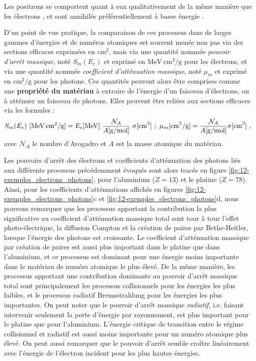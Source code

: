 \begin{refsection}
Les positrons se comportent quant à eux qualitativement de la même manière que les électrons \parencite{rohrlich_1954}, et sont annihilés préférentiellement à basse énergie \parencite{carron_2007}.


D'un point de vue pratique, la comparaison de ces processus dans de larges gammes d'énergies et de numéros atomiques est souvent menée non pas via des sections efficaces exprimées en $\si{\cm^2}$, mais via une quantité nommée \textit{pouvoir d'arrêt massique}, noté $S_m(E_e)$ et exprimé en $\si{\MeV ~ \cm^2\per\g}$ pour les électrons, et via une quantité nommée \textit{coefficient d'atténuation massique}, noté $\mu_m$ et exprimé en $\si{\cm^2\per\g}$ pour les photons. Ces quantités peuvent alors être comprises comme une \textbf{propriété du matériau} à extraire de l'énergie d'un faisceau d'électrons, ou à atténuer un faisceau de photons. Elles peuvent être reliées aux sections efficaces via les formules \parencite{carron_2007} :
\begin{equation}
    S_m(E_e) ~ \si{[MeV ~ cm^2/g]} = E_e \si{[MeV]} ~\dfrac{\mathcal{N}_A}{A \si{[g/mol]}} ~ \sigma \si{[cm^2]}~ ; ~
    \mu_m \si{[cm^2/g]} = \dfrac{\mathcal{N}_A}{A \si{[g/mol]}} \sigma \si{[cm^2]} ~ \rm ,
\end{equation}
avec $\mathcal{N}_A$ le nombre d'Avogadro et $A$ est la masse atomique du matériau.

Les pouvoirs d'arrêt des électrons et coefficients d'atténuation des photons liés aux différents processus précédemment évoqués sont alors tracés en figure \ref{fig:12-exemples_electrons_photons}, pour l'aluminium ($Z=13$) et le platine ($Z=78$). Ainsi, pour les coefficients d'atténuations affichés en figures \ref{fig:12-exemples_electrons_photons}c et \ref{fig:12-exemples_electrons_photons}d, nous pouvons remarquer que les processus apportant la contribution la plus significative au coefficient d'atténuation massique total sont tour à tour l'effet photo-électrique, la diffusion Compton et la création de paires par Bethe-Heitler, lorsque l'énergie des photons est croissante. Le coefficient d'atténuation massique par création de paires est aussi plus important dans le platine que dans l'aluminium, et ce processus est dominant pour une énergie moins importante dans le matériau de numéro atomique le plus élevé. De la même manière, les processus apportant une contribution dominante au pouvoir d'arrêt massique total sont principalement les processus collisionnels pour les énergies les plus faibles, et le processus radiatif Bremsstrahlung pour les énergies les plus importantes. On peut noter que le pouvoir d'arrêt massique \textit{radiatif}, i.e. faisant intervenir seulement la perte d'énergie par rayonnement, est plus important pour le platine que pour l'aluminium. L'énergie critique de transition entre le régime collisionnel et radiatif est aussi moins importante pour un numéro atomique plus élevé. On peut aussi remarquer que le pouvoir d'arrêt semble croître linéairement avec l'énergie de l'électron incident pour les plus hautes énergies.


\end{refsection}
